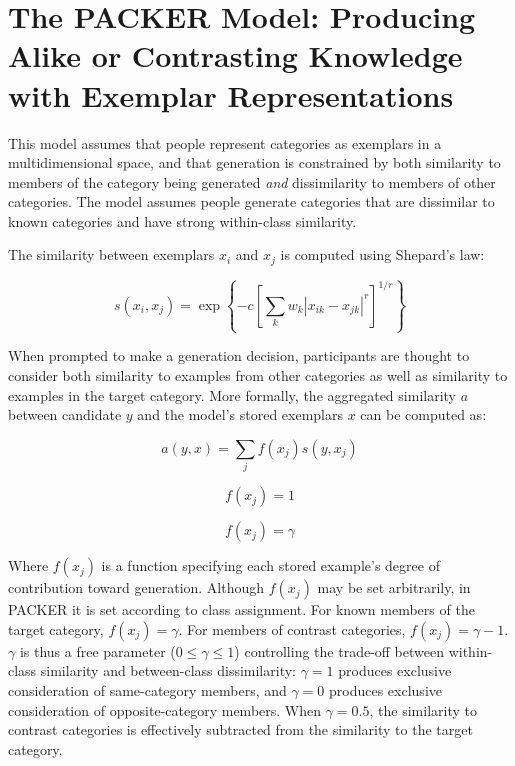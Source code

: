 \documentclass[12pt]{article}
\begin{document}
\section{The PACKER Model: Producing Alike or Contrasting Knowledge with Exemplar Representations}


This model assumes that people represent categories as exemplars in a multidimensional space, and that generation is constrained by both similarity to members of the category being generated \textit{and} dissimilarity to members of other categories. The model assumes people generate categories that are dissimilar to known categories and have strong within-class similarity.

The similarity between exemplars $x_i$ and $x_j$ is computed using Shepard's law:

\begin{equation}
s\left(x_i,x_j\right) = \exp \left\{ -c \left[\sum_{k}{ w_k \left| x_{ik} - x_{jk} \right|^r }\right]^{1/r} \right\}
\label{eq:similarity}
\end{equation}

When prompted to make a generation decision, participants are thought to consider both similarity to examples from other categories as well as similarity to examples in the target category. More formally, the aggregated similarity $a$ between candidate $y$ and the model's stored exemplars $x$ can be computed as:

\begin{equation}
  a(y, x) = \sum_j{f(x_j) s(y, x_j)}
\end{equation}

\begin{equation}
	f(x_j) = 1
\end{equation}

\begin{equation}
	f(x_j) = \gamma
\end{equation}

Where $f(x_j)$ is a function specifying each stored example's degree of contribution toward generation. Although $f(x_j)$ may be set arbitrarily, in PACKER it is set according to class assignment. For known members of the target category, $f(x_j) = \gamma$. For members of contrast categories, $f(x_j) = \gamma - 1$. $\gamma$ is thus a free parameter ($0 \leq \gamma \leq 1$) controlling the trade-off between within-class similarity and between-class dissimilarity: $\gamma = 1$ produces exclusive consideration of same-category members, and $\gamma = 0$ produces exclusive consideration of opposite-category members. When $\gamma = 0.5$, the similarity to contrast categories is effectively subtracted from the similarity to the target category.
\end{document}
